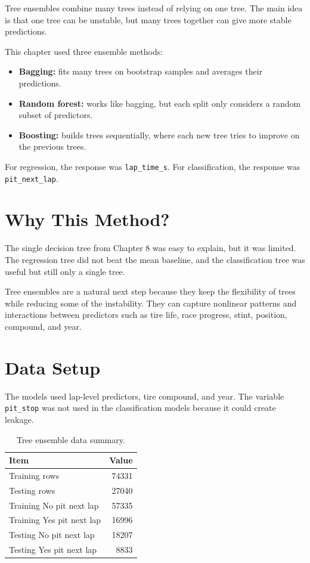 \documentclass[11pt,oneside,openany]{book}
\begin{document}
Tree ensembles combine many trees instead of relying on one tree. The main idea is that one tree can be unstable, but many trees together can give more stable predictions.

This chapter used three ensemble methods:

\begin{itemize}
    \item \textbf{Bagging:} fits many trees on bootstrap samples and averages their predictions.
    \item \textbf{Random forest:} works like bagging, but each split only considers a random subset of predictors.
    \item \textbf{Boosting:} builds trees sequentially, where each new tree tries to improve on the previous trees.
\end{itemize}

For regression, the response was \texttt{lap\_time\_s}. For classification, the response was \texttt{pit\_next\_lap}.

\section{Why This Method?}

The single decision tree from Chapter 8 was easy to explain, but it was limited. The regression tree did not beat the mean baseline, and the classification tree was useful but still only a single tree.

Tree ensembles are a natural next step because they keep the flexibility of trees while reducing some of the instability. They can capture nonlinear patterns and interactions between predictors such as tire life, race progress, stint, position, compound, and year.

\section{Data Setup}

The models used lap-level predictors, tire compound, and year. The variable \texttt{pit\_stop} was not used in the classification models because it could create leakage.

\begin{table}[H]
\centering
\small
\caption{Tree ensemble data summary.}
\begin{tabular}{lr}
\toprule
Item & Value\\
\midrule
Training rows & 74331\\
Testing rows & 27040\\
Training No pit next lap & 57335\\
Training Yes pit next lap & 16996\\
Testing No pit next lap & 18207\\
Testing Yes pit next lap & 8833\\
\bottomrule
\end{tabular}
\end{table}
\end{document}
